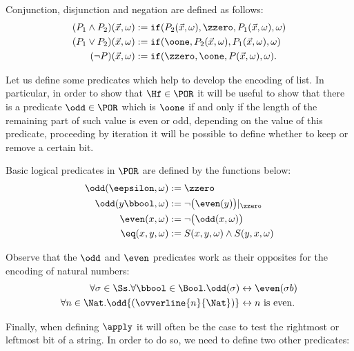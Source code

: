 \begin{conditional}{\notappendix}
  \begin{defn}
  Conjunction, disjunction and negation are
  defined as follows:
  \begin{align*}
  (P_1\wedge P_2)(\vec{x},\omega) &:=
  \mathtt{if}(P_2(\vec{x},\omega),\zzero,P_1(\vec{x},\omega),
  \omega) \\
  (P_1\vee P_2)(\vec{x},\omega) &:= \mathtt{if}(\oone,
  P_2(\vec{x},\omega), P_1(\vec{x},\omega), \omega) \\
  (\neg P)(\vec{x},\omega) &:= \mathtt{if}(\zzero,\oone,P(\vec{x},\omega),
  \omega).
  \end{align*}
  \end{defn}

  Let us define some predicates which
  help to develop the encoding of list.
  In particular, in order to show that $\Hf \in \POR$ it will be useful
  to show that there is a predicate $\odd \in \POR$
  which is $\oone$ if and only if the length of the remaining
  part of such value is even or odd,
  depending on the value of this predicate, proceeding by
  iteration it will be possible to define whether to keep or remove
  a certain bit.

  \begin{defn}
  {Basic logical predicates in $\POR$
  are defined by the functions below:}
  \begin{align*}
  \odd(\eepsilon,\omega) &:= \zzero \\
  \odd(y\bbool,\omega) &:= \neg\big(\even(y)\big)|_\zzero \\
  \even(x,\omega) &:= \neg\big(\odd(x,\omega)\big) \\
  \eq(x, y, \omega) &:= S(x, y, \omega) \land S(y, x, \omega)
  \end{align*}
  \end{defn}

  \begin{remark}
  Observe that the $\odd$ and $\even$
  predicates work as their opposites
  for the encoding of natural numbers:
  \begin{align*}
  \forall \sigma \in {\Ss}.\forall \bbool
  \in \Bool. \odd(\sigma) &\leftrightarrow
  \even(\sigma b) \\
  \forall n\in \Nat.\odd{(\ovverline{n}{\Nat})} &\leftrightarrow
  n \text{ is even.}
  \end{align*}
  \end{remark}

  Finally, when defining $\apply$ it will often be the case to
  test the rightmost or leftmost bit of a string.
  In order to do so, we need to define two other predicates:


\end{conditional}
